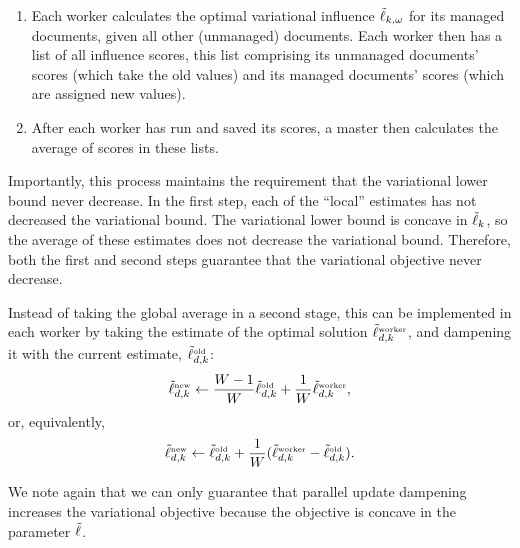 \begin{enumerate}
\item Each worker calculates the optimal variational influence
  $\tilde{\ell}_{k,\omega}$ for its managed documents, given all other
  (unmanaged) documents.  Each worker then has a list of all influence
  scores, this list comprising its unmanaged documents' scores (which take the
  old values) and its managed documents' scores (which are assigned new
  values).
  
\item After each worker has run and saved its scores, a master then
  calculates the average of scores in these lists.
\end{enumerate}
Importantly, this process maintains the requirement that the
variational lower bound never decrease.  In the first step, each of
the ``local'' estimates has not decreased the variational bound.  The
variational lower bound is concave in $\tilde{\ell}_{k}$, so the average of
these estimates does not decrease the variational bound.  Therefore,
both the first and second steps guarantee that the variational
objective never decrease.

Instead of taking the global average in a second stage, this can be
implemented in each worker by taking the estimate of the optimal
solution $\tilde{\ell}^{\mbox{\tiny worker}}_{d,k}$, and dampening it with
the current estimate, $\tilde{\ell}^{\mbox{\tiny old}}_{d,k}$:
 \[
  \tilde{\ell}^{\mbox{\tiny new}}_{d,k} \gets \frac{W - 1}{W} \tilde{\ell}^{\mbox{\tiny old}}_{d,k} + \frac{1}{W} \tilde{\ell}^{\mbox{\tiny worker}}_{d,k},
\]
or, equivalently,
 \[
 \tilde{\ell}^{\mbox{\tiny new}}_{d,k} \gets \tilde{\ell}^{\mbox{\tiny old}}_{d,k} + \frac{1}{W} (\tilde{\ell}^{\mbox{\tiny worker}}_{d,k} - \tilde{\ell}^{\mbox{\tiny old}}_{d,k}).
\]

We note again that we can only guarantee that parallel update
dampening increases the variational objective because the objective is
concave in the parameter $\tilde{\ell}$.
